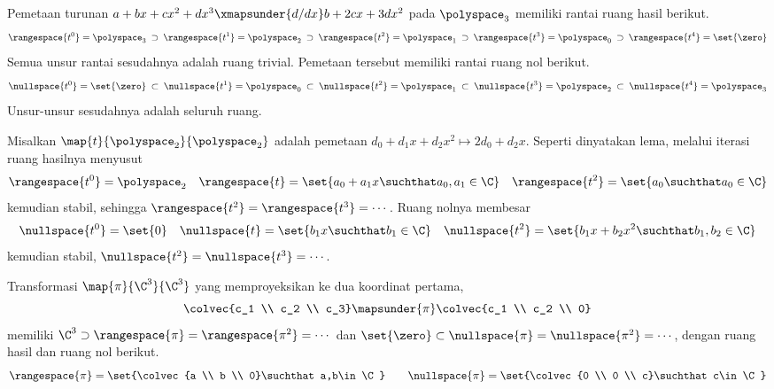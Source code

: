 \begin{example}
Pemetaan turunan $a+bx+cx^2+dx^3\xmapsunder{d/dx} b+2cx+3dx^2$ pada
$\polyspace_3$ memiliki rantai ruang hasil berikut.
\begin{equation*}
  \rangespace{t^0}=\polyspace_3
    \:\supset\:\rangespace{t^1}=\polyspace_2
    \:\supset\:\rangespace{t^2}=\polyspace_1
    \:\supset\:\rangespace{t^3}=\polyspace_0
    \:\supset\:\rangespace{t^4}=\set{\zero}
\end{equation*}
Semua unsur rantai sesudahnya adalah ruang trivial.
Pemetaan tersebut memiliki rantai ruang nol berikut.
\begin{equation*}
  \nullspace{t^0}=\set{\zero}
  \:\subset\: \nullspace{t^1}=\polyspace_0
  \:\subset\:\nullspace{t^2}=\polyspace_1
  \:\subset\:\nullspace{t^3}=\polyspace_2
  \:\subset\:\nullspace{t^4}=\polyspace_3
\end{equation*}
Unsur-unsur sesudahnya adalah seluruh ruang.
\end{example}

\begin{example} \label{exam:PolyRankFalls}
Misalkan \( \map{t}{\polyspace_2}{\polyspace_2} \) adalah pemetaan
\( d_0+d_1x+d_2x^2 \mapsto 2d_0+d_2x. \)
Seperti dinyatakan lema, melalui iterasi ruang hasilnya menyusut
\begin{equation*}
  \rangespace{t^0}=\polyspace_2
    \quad
  \rangespace{t}=\set{a_0+a_1x\suchthat a_0,a_1\in\C}
    \quad
  \rangespace{t^2}=\set{a_0\suchthat a_0\in\C}
\end{equation*}
kemudian stabil, sehingga $\rangespace{t^2}=\rangespace{t^3}=\cdots$.
Ruang nolnya membesar
\begin{equation*}
  \nullspace{t^0}=\set{0}
    \quad
  \nullspace{t}=\set{b_1x\suchthat b_1\in\C}
    \quad
  \nullspace{t^2}=\set{b_1x+b_2x^2\suchthat b_1,b_2\in\C}
\end{equation*}
kemudian stabil, $\nullspace{t^2}=\nullspace{t^3}=\cdots$.
\end{example}

\begin{example}
Transformasi \( \map{\pi}{\C^3}{\C^3} \) yang memproyeksikan ke dua koordinat
pertama,
\begin{equation*}
   \colvec{c_1 \\ c_2 \\ c_3}
     \mapsunder{\pi}
   \colvec{c_1 \\ c_2 \\ 0}
\end{equation*}
memiliki \( \C^3\supset\rangespace{\pi}=\rangespace{\pi^2}=\cdots \) dan
\( \set{\zero}\subset\nullspace{\pi}=\nullspace{\pi^2}=\cdots\, \), dengan
ruang hasil dan ruang nol berikut.
\begin{equation*}
  \rangespace{\pi}=\set{\colvec{a \\ b \\ 0}\suchthat a,b\in\C}
  \qquad
  \nullspace{\pi}=\set{\colvec{0 \\ 0 \\ c}\suchthat c\in\C}
\end{equation*}
\end{example}

